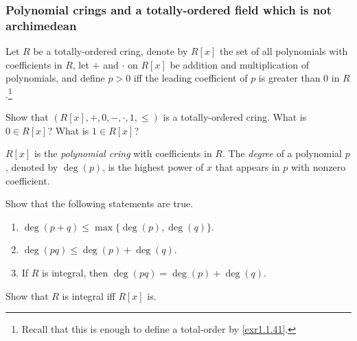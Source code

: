 \subsubsection{Polynomial crings and a totally-ordered field which is not archimedean}

\begin{dfn}
\begin{savenotes}
Let $R$ be a totally-ordered cring, denote by $R[x]$ the set of all polynomials with coefficients in $R$, let $+$ and $\cdot$ on $R[x]$ be addition and multiplication of polynomials, and define $p>0$ iff the leading coefficient of $p$ is greater than $0$ in $R$.\footnote{Recall that this is enough to define a total-order by \cref{exr1.1.41}.} 
\begin{exr}
Show that $\left( R[x],+,0,-,\cdot ,1,\leq \right)$ is a totally-ordered cring.  What is $0\in R[x]$?  What is $1\in R[x]$?
\end{exr}
\noindent
$R[x]$ is the \emph{polynomial cring} with coefficients in $R$.  The \emph{degree} of a polynomial $p$, denoted by $\deg (p)$, is the highest power of $x$ that appears in $p$ with nonzero coefficient.
\end{savenotes}
\end{dfn}
\begin{exr}
Show that the following statements are true.
\begin{enumerate}
\item $\deg (p+q)\leq \max \{ \deg (p),\deg (q)\}$.
\item $\deg (pq)\leq \deg (p)+\deg (q)$.
\item If $R$ is integral, then $\deg (pq)=\deg (p)+\deg (q)$.
\end{enumerate}
\end{exr}
\begin{exr}
Show that $R$ is integral iff $R[x]$ is.
\end{exr}
